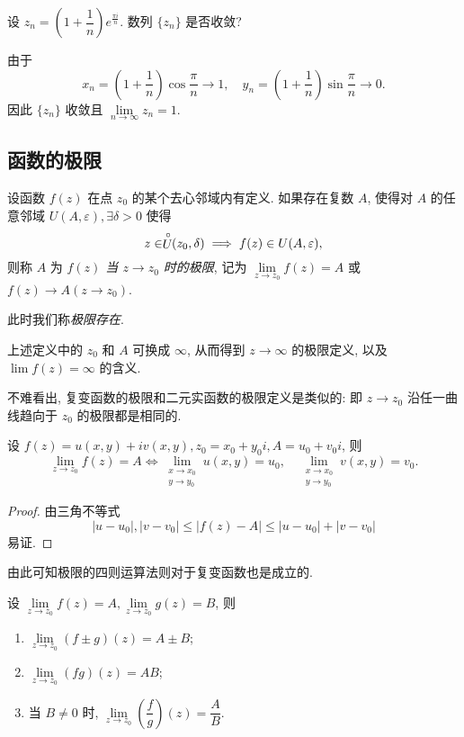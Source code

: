 \begin{example}
  设 $z_n=\left(1+\dfrac1n\right)e^{\frac{\pi i}n}$. 数列 $\{z_n\}$ 是否收敛?
\end{example}

\begin{solution}
  由于
  \[x_n=\left(1+\frac1n\right)\cos\frac\pi n\to 1,\quad
  y_n=\left(1+\frac1n\right)\sin\frac\pi n\to 0.\]
  因此 $\{z_n\}$ 收敛且 $\lim\limits_{n\to\infty}z_n=1$.
\end{solution}

\subsection{函数的极限}

\begin{definition}
  设函数 $f(z)$ 在点 $z_0$ 的某个去心邻域内有定义.
  如果存在复数 $A$, 使得对 $A$ 的任意邻域 $U(A,\varepsilon),\exists\delta>0$ 使得
    \[z\in\stackrel{\circ}{U}\!\!(z_0,\delta)\implies f(z)\in U(A,\varepsilon),\]
  则称 $A$ 为 \emph{$f(z)$ 当 $z\to z_0$ 时的极限}, 记为 \emph{$\lim\limits_{z\to z_0}f(z)=A$} 或 \emph{$f(z)\to A (z\to z_0)$}.
\end{definition}
此时我们称\emph{极限存在}.

上述定义中的 $z_0$ 和 $A$ 可换成 $\infty$, 从而得到 $z\to\infty$ 的极限定义, 以及 $\lim f(z)=\infty$ 的含义.

不难看出, 复变函数的极限和二元实函数的极限定义是类似的:
即 $z\to z_0$ 沿任一曲线趋向于 $z_0$ 的极限都是相同的.

\begin{theorem}[函数极限的等价刻画]
  设 $f(z)=u(x,y)+iv(x,y),z_0=x_0+y_0i,A=u_0+v_0i$, 则
  \[\lim_{z\to z_0}f(z)=A\iff
  \lim_{\substack{x\to x_0\\y\to y_0}}u(x,y)=u_0,\quad
  \lim_{\substack{x\to x_0\\y\to y_0}}v(x,y)=v_0.\]
\end{theorem}

\begin{proof}
  由三角不等式
  \[|u-u_0|,|v-v_0|\le|f(z)-A|\le|u-u_0|+|v-v_0|\]
  易证.
\end{proof}

由此可知极限的四则运算法则对于复变函数也是成立的.

\begin{theorem}[函数极限的四则运算法则]
  设 $\lim\limits_{z\to z_0}f(z)=A,\lim\limits_{z\to z_0}g(z)=B$, 则
  \begin{enumerate}
    \item $\lim\limits_{z\to z_0}(f\pm g)(z)=A\pm B$;
    \item $\lim\limits_{z\to z_0}(fg)(z)=AB$;
    \item 当 $B\neq 0$ 时, $\lim\limits_{z\to z_0}\left(\dfrac fg\right)(z)=\dfrac AB$.
  \end{enumerate}
\end{theorem}

